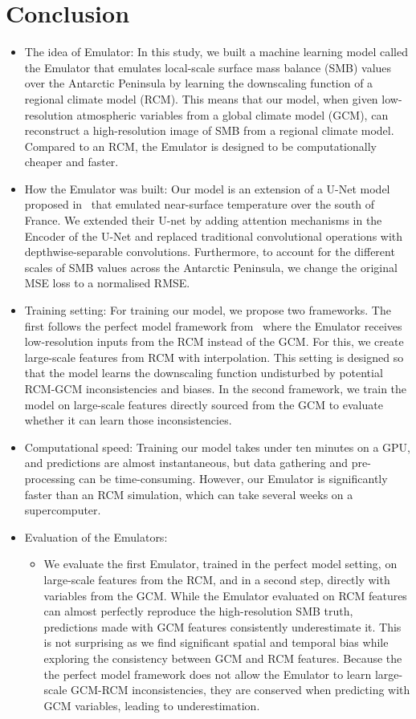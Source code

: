 \documentclass[a4paper,11pt,oneside]{report}
\begin{document}
\chapter{Conclusion}
\begin{itemize}
    \item The idea of Emulator: In this study, we built a machine learning model called the Emulator that emulates local-scale surface mass balance (SMB) values over the Antarctic Peninsula by learning the downscaling function of a regional climate model (RCM). This means that our model, when given low-resolution atmospheric variables from a global climate model (GCM), can reconstruct a high-resolution image of SMB from a regional climate model. Compared to an RCM, the Emulator is designed to be computationally cheaper and faster.   
    \item How the Emulator was built: Our model is an extension of a U-Net model proposed in~\cite{Doury} that emulated near-surface temperature over the south of France. We extended their U-net by adding attention mechanisms in the Encoder of the U-Net and replaced traditional convolutional operations with depthwise-separable convolutions. Furthermore, to account for the different scales of SMB values across the Antarctic Peninsula, we change the original MSE loss to a normalised RMSE. 
    \item Training setting: For training our model, we propose two frameworks. The first follows the perfect model framework from~\cite{Doury} where the Emulator receives low-resolution inputs from the RCM instead of the GCM. For this, we create large-scale features from RCM with interpolation. This setting is designed so that the model learns the downscaling function undisturbed by potential RCM-GCM inconsistencies and biases. In the second framework, we train the model on large-scale features directly sourced from the GCM to evaluate whether it can learn those inconsistencies. 
    \item Computational speed: Training our model takes under ten minutes on a GPU, and predictions are almost instantaneous, but data gathering and pre-processing can be time-consuming. However, our Emulator is significantly faster than an RCM simulation, which can take several weeks on a supercomputer. 
    \item Evaluation of the Emulators:
    \begin{itemize}
        \item We evaluate the first Emulator, trained in the perfect model setting, on large-scale features from the RCM, and in a second step, directly with variables from the GCM. While the Emulator evaluated on RCM features can almost perfectly reproduce the high-resolution SMB truth, predictions made with GCM features consistently underestimate it. This is not surprising as we find significant spatial and temporal bias while exploring the consistency between GCM and RCM features. Because the the perfect model framework does not allow the Emulator to learn large-scale GCM-RCM inconsistencies, they are conserved when predicting with GCM variables, leading to underestimation. 

\end{itemize}
\end{itemize}
\end{document}
